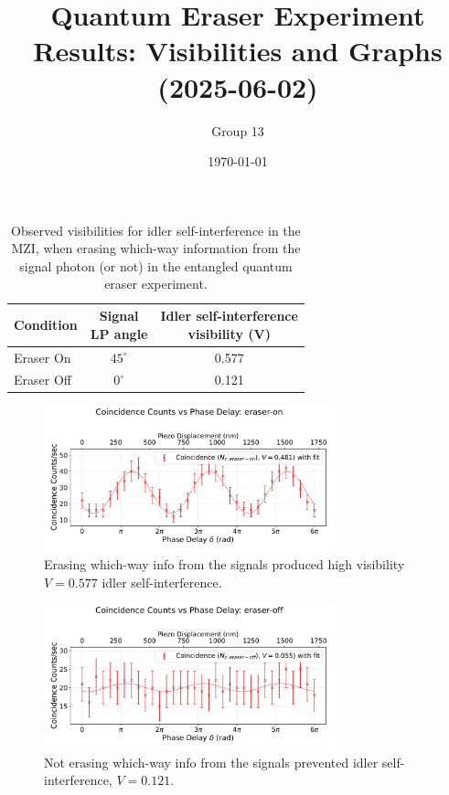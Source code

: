 \documentclass{article}
\title{Quantum Eraser Experiment Results: Visibilities and Graphs (2025-06-02)}
\author{Group 13} %
\date{\today}
\begin{document}
\pagestyle{empty} %

%

\begin{table}[h!]
\centering
\begin{tabular}{lcc}
\toprule
Condition & \makecell{Signal \\ LP angle} & \makecell{Idler self-interference \\ visibility (V)} \\
\midrule
Eraser On          & $45^\circ$  & 0.577 \\
Eraser Off         & $0^\circ$ & 0.121 \\
\bottomrule
\end{tabular}
\caption*{
  Observed visibilities for idler self-interference in the MZI,
  when erasing which-way information from the signal photon (or not)
  in the entangled quantum eraser experiment.}
\end{table}

\begin{figure}[h!]
\centering
\includegraphics[width=0.75\textwidth]{coincidence_counts_eraser_on.pdf}
\caption*{
  Erasing which-way info from the signals
  produced high visibility $V=0.577$ idler self-interference.
}
\end{figure}

\begin{figure}[h!]
\centering
\includegraphics[width=0.75\textwidth]{coincidence_counts_eraser_off.pdf}
\caption*{
  Not erasing which-way info from the signals
  prevented idler self-interference, $V=0.121$.
}
\end{figure}
\end{document}
